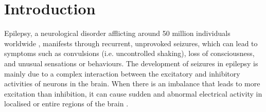 \documentclass[10pt]{article}
\begin{document}
\begin{sloppypar}
  \begin{abstract}
  \end{abstract}

  \pagebreak


  \section{Introduction}
  \label{sec:introduction}

  Epilepsy, a neurological disorder afflicting around 50 million individuals worldwide \citep{world2019epilepsy}, manifests through recurrent, unprovoked seizures, which can lead to symptoms such as convulsions (i.e. uncontrolled shaking), loss of consciousness, and unusual sensations or behaviours. The development of seizures in epilepsy is mainly due to a complex interaction between the excitatory and inhibitory activities of neurons in the brain. When there is an imbalance that leads to more excitation than inhibition, it can cause sudden and abnormal electrical activity in localised or entire regions of the brain \citep{robinson_propagation_1997}.


\end{sloppypar}
\end{document}

